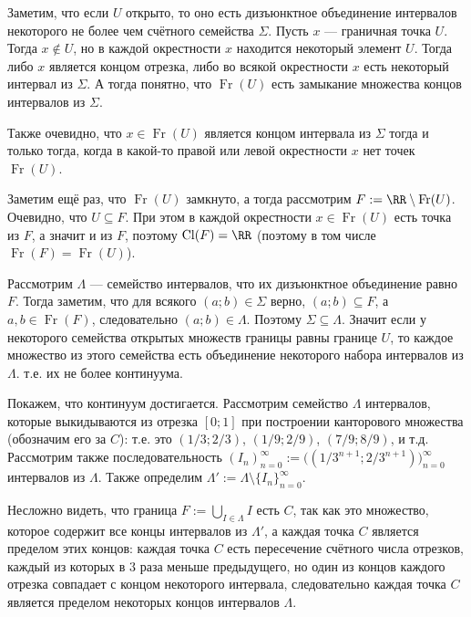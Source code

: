 \documentclass[12pt,a4paper]{article}
\DeclareMathOperator{\Cl}{Cl}
\DeclareMathOperator{\Fr}{Fr}
\begin{document}
    \begin{problem}{31}
        Заметим, что если $U$ открыто, то оно есть дизъюнктное объединение интервалов некоторого не более чем счётного семейства $\Sigma$. Пусть $x$ --- граничная точка $U$. Тогда $x \notin U$, но в каждой окрестности $x$ находится некоторый элемент $U$. Тогда либо $x$ является концом отрезка, либо во всякой окрестности $x$ есть некоторый интервал из $\Sigma$. А тогда понятно, что $\Fr(U)$ есть замыкание множества концов интервалов из $\Sigma$.

        Также очевидно, что $x \in \Fr(U)$ является концом интервала из $\Sigma$ тогда и только тогда, когда в какой-то правой или левой окрестности $x$ нет точек $\Fr(U)$.

        Заметим ещё раз, что $\Fr(U)$ замкнуто, а тогда рассмотрим $F := \RR \setminus \Fr(U)$. Очевидно, что $U \subseteq F$. При этом в каждой окрестности $x \in \Fr(U)$ есть точка из $F$, а значит и из $F$, поэтому $\Cl(F) = \RR$ (поэтому в том числе $\Fr(F) = \Fr(U)$).
        
        Рассмотрим $\Lambda$ --- семейство интервалов, что их дизъюнктное объединение равно $F$. Тогда заметим, что для всякого $(a; b) \in \Sigma$ верно, $(a; b) \subseteq F$, а $a, b \in \Fr(F)$, следовательно $(a; b) \in \Lambda$. Поэтому $\Sigma \subseteq \Lambda$. Значит если у некоторого семейства открытых множеств границы равны границе $U$, то каждое множество из этого семейства есть объединение некоторого набора интервалов из $\Lambda$. т.е. их не более континуума.

        Покажем, что континуум достигается. Рассмотрим семейство $\Lambda$ интервалов, которые выкидываются из отрезка $[0; 1]$ при построении канторового множества (обозначим его за $C$): т.е. это $(1/3; 2/3)$, $(1/9; 2/9)$, $(7/9; 8/9)$, и т.д. Рассмотрим также последовательность $(I_n)_{n=0}^\infty := \bigl((1/3^{n+1}; 2/3^{n+1})\bigr)_{n=0}^\infty$ интервалов из $\Lambda$. Также определим $\Lambda' := \Lambda \setminus \{I_n\}_{n=0}^\infty$.

        Несложно видеть, что граница $F := \bigcup_{I \in \Lambda} I$ есть $C$, так как это множество, которое содержит все концы интервалов из $\Lambda'$, а каждая точка $C$ является пределом этих концов: каждая точка $C$ есть пересечение счётного числа отрезков, каждый из которых в $3$ раза меньше предыдущего, но один из концов каждого отрезка совпадает с концом некоторого интервала, следовательно каждая точка $C$ является пределом некоторых концов интервалов $\Lambda$.


\end{problem}
\end{document}
